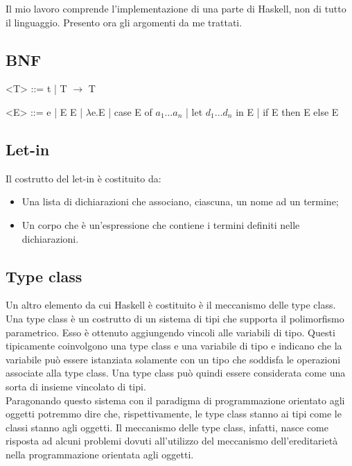 \documentclass[12pt,a4paper,openright,twoside]{report}
\begin{document}
Il mio lavoro comprende l'implementazione di una parte di Haskell, non di tutto il linguaggio. Presento ora gli argomenti da me trattati.

\subsection{BNF}
\begin{grammar}
 \let\syntleft\relax    %
 \let\syntright\relax   %
 <T> ::= t | T $\rightarrow$ T
 
 <E> ::= e | E E | $\lambda$e.E | case E of $a_1 \ldots a_n$ | let $d_1 \ldots d_n$ in E | if E then E else E
\end{grammar}


\subsection{Let-in}
Il costrutto del let-in è costituito da:
\begin{itemize}
 \item Una lista di dichiarazioni che associano, ciascuna, un nome ad un termine;
 \item Un corpo che è un'espressione che contiene i termini definiti nelle dichiarazioni.
\end{itemize}

\subsection{Type class}
Un altro elemento da cui Haskell è costituito è il meccanismo delle type class. Una type class è un costrutto di un sistema di tipi che supporta il polimorfismo parametrico. Esso è ottenuto aggiungendo vincoli alle variabili di tipo. Questi tipicamente coinvolgono una type class e una variabile di tipo e indicano che la variabile può essere istanziata solamente con un tipo che soddisfa le operazioni associate alla type class. Una type class può quindi essere considerata come una sorta di insieme vincolato di tipi.\\
Paragonando questo sistema con il paradigma di programmazione orientato agli oggetti potremmo dire che, rispettivamente, le type class stanno ai tipi come le classi stanno agli oggetti. Il meccanismo delle type class, infatti, nasce come risposta ad alcuni problemi dovuti all'utilizzo del meccanismo dell'ereditarietà nella programmazione orientata agli oggetti.
\end{document}
